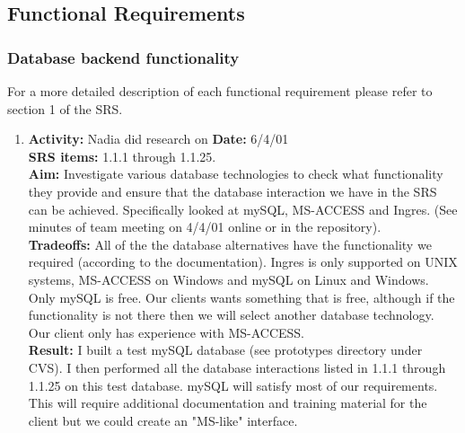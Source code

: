 \documentclass[22pt, a4paper]{article}
\begin{document}
\begin{Large}
\pagebreak

\subsection{Functional Requirements}

\subsubsection{Database backend functionality}
For a more detailed description of each functional requirement please refer
to section 1 of the SRS.
\begin{enumerate}
\item
{\bf Activity: } Nadia did research on {\bf Date:} 6/4/01 \\
{\bf SRS items:} 1.1.1 through 1.1.25. \\
{\bf Aim:} Investigate various database technologies to check what
functionality they provide and ensure that the database interaction we have
in the SRS can be achieved.  Specifically looked at mySQL, MS-ACCESS and
Ingres.  (See minutes of team meeting on 4/4/01 online or in the
repository).  \\
{\bf Tradeoffs:} All of the the database alternatives have the
functionality we required (according to the documentation).  Ingres is
only supported on UNIX systems, MS-ACCESS on Windows and mySQL on Linux and
Windows.  Only mySQL is free.  Our clients wants something that is free,
although if the functionality is not there then we will select another
database technology.  Our client only has experience with MS-ACCESS. \\
{\bf Result:} I built a test mySQL database (see prototypes directory under
CVS).  I then performed all the database interactions listed in 1.1.1
through 1.1.25 on this test database.  mySQL will satisfy most of our
requirements.  This will require additional documentation and training
material for the client but we could create an "MS-like" interface.
\end{enumerate}


\end{Large}
\end{document}

